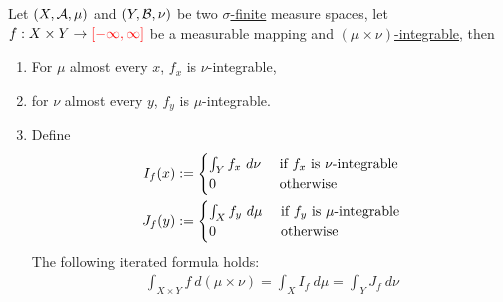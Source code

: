 \documentclass[11pt]{article}
\newcommand{\dmu}[0]{\ d\mu}
\begin{document}
	\begin{theorem}
		Let $(X, \mathcal{{A}}, \mu)$ and $(Y, \mathcal{{B}}, \nu)$ be two \ul{$\sigma$-finite} measure spaces, let $f: X \times Y \to \textcolor{red}{[-\infty, \infty]}$ be a measurable mapping and \ul{$(\mu \times \nu)$-integrable}, then
		\begin{enumerate}
			\item For $\mu$ almost every $x$, $f_x$ is $\nu$-integrable,
			\item for $\nu$ almost every $y$, $f_y$ is $\mu$-integrable.
			\item Define
			\begin{align}
				I_f(x) &:= \begin{cases}
					\int_Y f_x\ d\nu &\text{{ if $f_x$ is $\nu$-integrable}} \\
					0 &\text{{ otherwise}}
				\end{cases} \\
				J_f(y) &:= \begin{cases}
					\int_X f_y\ d\mu &\text{{ if $f_y$ is $\mu$-integrable}} \\
					0 &\text{{ otherwise}}
				\end{cases}
			\end{align}
			The following iterated formula holds:
			\begin{align}
				\int_{X \times Y} f\ d(\mu \times \nu) = \int_X I_f\dmu = \int_Y J_f\ d\nu
			\end{align}
		\end{enumerate}
		

\end{theorem}
\end{document}
